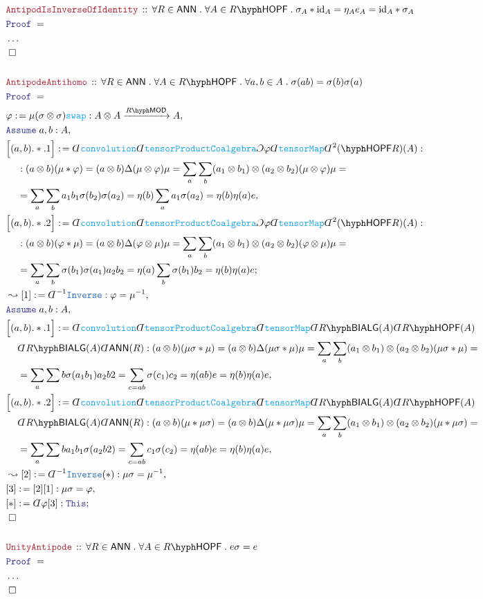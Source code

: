 \documentclass[12pt]{scrartcl}%
\newcommand{\TYPE}[1]{\textcolor{NavyBlue}{\mathtt{#1}}}%
\newcommand{\FUNC}[1]{\textcolor{Cerulean}{\mathtt{#1}}}%
\newcommand{\LOGIC}[1]{\textcolor{Blue}{\mathtt{#1}}}%
\newcommand{\THM}[1]{\textcolor{Maroon}{\mathtt{#1}}}%
\renewcommand{\.}{\; . \;} %
\newcommand{\de}{: \kern 0.1pc =} %
\newcommand{\Theorem}[2]{& \THM{#1} \, :: \, #2 \\ & \Proof = \\ } %
\newcommand{\NewLine}{\\ & \kern 1pc}%
\newcommand{\Page}[1]{ \begin{align*} #1 \end{align*}  }%
\newcommand{ \bd }{ \ByDef }%
\newcommand{\NoProof}{ & \ldots \\ \EndProof}%
\DeclareMathOperator*{\id}{id}%
\newcommand{\Say}[3]{& #1 \de #2 : #3, \\} %
\newcommand{\Conclude}[3]{& #1 \de #2 : #3; \\}%
\newcommand{\Derive}[3]{& \leadsto #1 \de #2 : #3, \\} %
\newcommand{\Assume}[2]{& \LOGIC{Assume} \; #1 : #2, \\} %
\newcommand{\QED}{\; \square} %
\newcommand{\EndProof}{& \QED \\} %
\newcommand{\ByDef}{\rotatebox[origin=c]{-180}{$D$}}%
\newcommand{\ByConstr}{\rotatebox[origin=c]{-180}{$C$}}%
\newcommand{\Proof}{\LOGIC{Proof} \; } %
\newcommand{\Arrow}[1]{\xrightarrow{#1}}%
\newcommand{\LMOD}[1]{#1\hyph\mathsf{MOD}} %
\newcommand{\ANN}{\mathsf{ANN}} %
\newcommand{\BIALG}[1]{#1\hyph\mathsf{BIALG}}%
\newcommand{\HOPF}[1]{#1\hyph\mathsf{HOPF}}%
\begin{document}
\Page{
	\Theorem{AntipodIsInverseOfIdentity}
	{
		\forall R \in \ANN \. 
		\forall A \in \HOPF{R} \.
		\sigma_A * {\id}_A = \eta_A e_A = {\id}_A * \sigma_A
	}
	\NoProof
	\\
	\Theorem{AntipodeAntihomo}
	{
		\forall R \in \ANN \.
		\forall A \in \HOPF{R} \.
		\forall a,b \in A \. 
		\sigma(ab) = \sigma(b)\sigma(a)
	}
	\Say{\varphi}{ \mu(\sigma \otimes \sigma)\FUNC{swap}  }{A \otimes A \Arrow{\LMOD{R}} A}
	\Assume{a,b}{A}
	\Say{\Big[(a,b).*.1\Big]}
	{
		\bd \FUNC{convolution}
		\bd \FUNC{tensorProductCoalgebra}
		\ByConstr \varphi \bd \FUNC{tensorMap} 
		\bd^2 \HOPF(R)(A)		
	}
	{
		\NewLine : 
		(a \otimes b)(\mu * \varphi) = 
		(a \otimes b)\Delta (\mu \otimes \varphi) \mu =
		\sum_a \sum_b  (a_1 \otimes b_1) \otimes (a_2 \otimes b_2) 
		(\mu \otimes \varphi) \mu  = \NewLine = 
		\sum_a \sum_b a_1 b_1 \sigma(b_2) \sigma(a_2) = 
		\eta(b) \sum_a a_1 \sigma(a_2) =
		\eta(b) \eta(a) e
	}
	\Conclude{\Big[(a,b).*.2\Big]}
	{
		\bd \FUNC{convolution}
		\bd \FUNC{tensorProductCoalgebra}
		\ByConstr \varphi \bd \FUNC{tensorMap} 
		\bd^2 \HOPF(R)(A)		
	}
	{
		\NewLine :
		(a \otimes b)(\varphi * \mu) = 
		(a \otimes b)\Delta (\varphi \otimes \mu) \mu =
		\sum_a \sum_b  (a_1 \otimes b_1) \otimes (a_2 \otimes b_2) 
		(\varphi \otimes \mu) \mu  =  \NewLine =
		\sum_a \sum_b \sigma(b_1) \sigma(a_1) a_2 b_2 = 
		\eta(a) \sum_b  \sigma(b_1) b_2 =
		\eta(b) \eta(a) e
	}
	\Derive{[1]}{\bd^{-1} \TYPE{Inverse}}{ \varphi = \mu^{-1}  }
	\Assume{a,b}{A}
	\Say{\Big[(a,b).*.1\Big]}{
		\bd \FUNC{convolution}
		\bd \FUNC{tensorProductCoalgebra}
		\bd \FUNC{tensorMap}
		\bd \BIALG{R}(A)
		\bd \HOPF{R}(A)
		\NewLine
		\bd \BIALG{R}(A)\bd \ANN(R)
	}
	{
		(a \otimes b)( \mu \sigma  * \mu) =
		(a \otimes b) \Delta ( \mu \sigma * \mu  ) \mu =
		\sum_a \sum_b  (a_1 \otimes b_1) \otimes (a_2 \otimes b_2)
		(\mu \sigma * \mu)  = \NewLine = 
		\sum_a \sum b \sigma(a_1b_1)a_2b2 = 
		\sum_{c = ab} \sigma(c_1)c_2 = 
		\eta(ab)e = 
		\eta(b)\eta(a)e
	}
	\Say{\Big[(a,b).*.2\Big]}{
		\bd \FUNC{convolution}
		\bd \FUNC{tensorProductCoalgebra}
		\bd \FUNC{tensorMap}
		\bd \BIALG{R}(A)
		\bd \HOPF{R}(A)
		\NewLine 
		\bd \BIALG{R}(A)\bd \ANN(R)
	}
	{
		(a \otimes b)( \mu  * \mu\sigma) =
		(a \otimes b) \Delta ( \mu  * \mu\sigma  ) \mu =
		\sum_a \sum_b  (a_1 \otimes b_1) \otimes (a_2 \otimes b_2)
		(\mu  * \mu \sigma)  = \NewLine = 
		\sum_a \sum b  a_1b_1 \sigma(a_2b2) = 
		\sum_{c = ab} c_1\sigma(c_2) = 
		\eta(ab)e = 
		\eta(b)\eta(a)e
	}
	\Derive{[2]}{\bd^{-1} \TYPE{Inverse}(*)}
	{
		\mu\sigma = \mu^{-1}
	}
	\Say{[3]}{[2][1]}{ \mu\sigma = \varphi  }
	\Conclude{[*]}{\bd \varphi [3]}{ \LOGIC{This} }
	\EndProof
	\\
	\Theorem{UnityAntipode}
	{
		\forall R \in \ANN \.
		\forall A \in \HOPF{R} \.
		e \sigma = e
	}
	\NoProof
}
\end{document}
